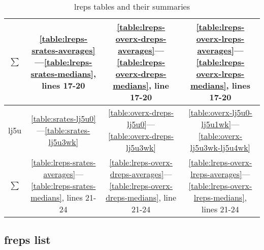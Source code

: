 \documentclass[10pt,oneside]{memoir}
\begin{document}
\begin{table}
\begin{tabular}{|cccc|}
$\sum$ & \ref{table:lreps-srates-averages}—\ref{table:lreps-srates-medians}, lines 17-20 & \ref{table:lreps-overx-dreps-averages}—\ref{table:lreps-overx-dreps-medians}, line 17-20 & \ref{table:lreps-overx-lreps-averages}—\ref{table:lreps-overx-lreps-medians}, lines 17-20  \\
\hline
lj5u & \ref{table:srates-lj5u0}—\ref{table:srates-lj5u3wk} & \ref{table:overx-dreps-lj5u0}—\ref{table:overx-dreps-lj5u3wk} & \ref{table:overx-lj5u0-lj5u1wk}—\ref{table:overx-lj5u3wk-lj5u4wk} \\
$\sum$ & \ref{table:lreps-srates-averages}—\ref{table:lreps-srates-medians}, lines 21-24 & \ref{table:lreps-overx-dreps-averages}—\ref{table:lreps-overx-dreps-medians}, line 21-24 & \ref{table:lreps-overx-lreps-averages}—\ref{table:lreps-overx-lreps-medians}, lines 21-24  \\
\bottomrule
\end{tabular}
\caption{lreps tables and their summaries}
\label{table:lreps-tables}
\end{table}
\pagebreak \subsection{freps list}
\label{frepslist}
\end{document}
